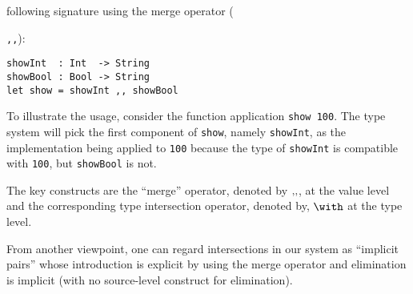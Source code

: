 following signature using the merge operator ({\lstinline{,,}):
\begin{lstlisting}
showInt  : Int  -> String
showBool : Bool -> String
let show = showInt ,, showBool
\end{lstlisting}

To illustrate the usage, consider the function application \lstinline{show 100}.
The type system will pick the first component of \lstinline{show}, namely
\lstinline{showInt}, as the implementation being applied to \lstinline{100}
because the type of \lstinline{showInt} is compatible with \lstinline{100}, but
\lstinline{showBool} is not.

The key constructs are the ``merge'' operator, denoted by $ ,\!, $, at the
value level and the corresponding type intersection operator, denoted by,
$ \intersects $ at the type level.

From another viewpoint, one can regard intersections in our system as ``implicit
pairs'' whose introduction is explicit by using the merge operator and
elimination is implicit (with no source-level construct for
elimination). 








}
